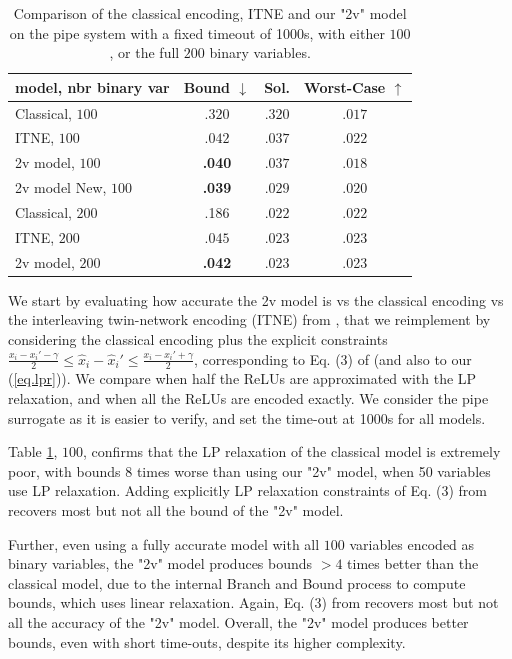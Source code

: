 \begin{table}[b!]
	\centering
	\begin{tabular}{||l|c|c|c||}\hline\hline
		model, nbr binary var &        Bound $\downarrow$ &  Sol. &      Worst-Case $\uparrow$ \\\hline \hline
	Classical, $100$ &    $.320$ &  $.320$ & $.017$ 
    \\\hline
	ITNE, $100$ &    $.042$ &  $.037$ & $.022$
	\\ \hline
    2v model, $100$ &    {\bf .040} &  $.037$ &  $.018$ 
    \\\hline \hline
     2v model New, $100$ &    {\bf .039} &  $.029$ &  $.020$ 
    \\\hline \hline
    Classical, $200$ &  .186  &  $.022$ & $.022$ 
    \\\hline
	ITNE, $200$ &    $.045$ &  $.023$ & .023
    \\\hline
	2v model, $200$&     {\bf .042} &  $.023$ &   .023 
    \\\hline \hline
	\end{tabular}
	\caption{Comparison of the classical encoding, ITNE and our "2v" model on the pipe system with a fixed timeout of 1000s, with either $100$, 
    or the full $200$ binary variables.}
    \label{table.classical}
\end{table}

We start by evaluating how accurate the 2v model is vs the classical encoding vs the interleaving twin-network encoding (ITNE) from \cite{lipshitz,ITNE}, that we reimplement by considering the classical encoding plus the explicit constraints $\frac{x_i-x_i' - \gamma}{2} \leq \hat{x}_i-\hat{x}_i' \leq \frac{x_i-x_i' + \gamma}{2}$, corresponding to Eq. (3) of \cite{ITNE} (and also to our (\ref{eq.lpr})). We compare when half the ReLUs are approximated with the LP relaxation, and when all the ReLUs are encoded exactly. We consider the pipe surrogate as it is easier to verify, and set the time-out at 1000s for all models.


Table \ref{table.classical}, $100$, confirms that the LP relaxation of the classical model is extremely poor, with bounds $8$ times worse than using our "2v" model, when 50 variables use LP relaxation. Adding explicitly LP relaxation constraints of Eq. (3) from \cite{ITNE} recovers most but not all the bound of the "2v" model.

Further, even using a fully accurate model with all $100$ variables encoded as binary variables, the "2v" model produces bounds $>4$ times better than the classical model, due to the internal Branch and Bound process to compute bounds, which uses linear relaxation. Again, 
Eq. (3) from \cite{ITNE} recovers most but not all the accuracy of the "2v" model.
Overall, the "2v" model produces better bounds, even with short time-outs, despite its higher complexity.

